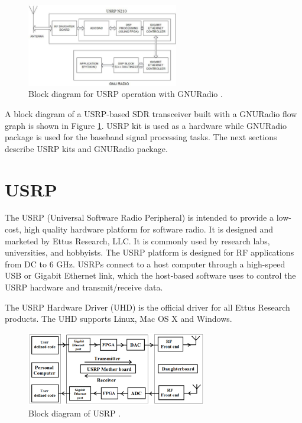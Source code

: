 \begin{figure}
\centering
\includegraphics[width=0.59\textwidth]{../images/usrpGNURadioBlock}
\caption[Block diagram for USRP operation with GNURadio]{Block
diagram for USRP operation with GNURadio {\cite{kranthi13}}.}
\label{usrpGNURadioBlock}
\end{figure}

A block diagram of a USRP-based SDR transceiver built with a GNURadio flow 
graph is shown in Figure \ref{usrpGNURadioBlock}. USRP kit is used as a
hardware while GNURadio
package is used for the baseband signal processing tasks. The next sections
describe USRP kits and GNURadio package.

\section{USRP}

The USRP (Universal Software Radio Peripheral) is intended to provide a 
low-cost, high quality hardware platform for software radio. It is designed
and marketed by Ettus Research, LLC. It is commonly used by research labs,
universities, and hobbyists. The USRP platform is designed for RF applications
from DC to 6 GHz. USRPs connect to a host computer through a high-speed USB or
Gigabit Ethernet link, which the host-based software uses to control the USRP
hardware and transmit/receive data.

The USRP Hardware Driver (UHD) is the official driver for all Ettus Research
products. The UHD supports Linux, Mac OS X and Windows.

\begin{figure}
\centering
\includegraphics[width=0.7\textwidth]{../images/usrpBlock}
\caption[Block diagram of USRP]{Block diagram of USRP {\cite{kranthi13}}.}
\label{usrpBlock}
\end{figure}

